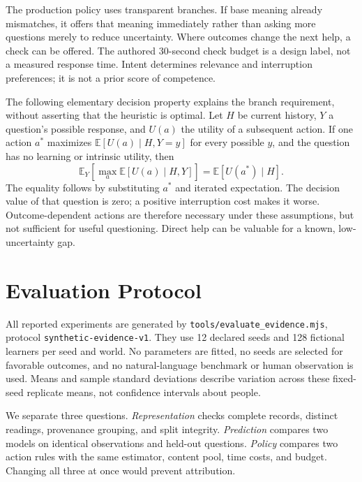 \documentclass{article}
\newcommand{\artifact}[1]{\nolinkurl{#1}}
\begin{document}
The production policy uses transparent branches. If base meaning already mismatches, it offers that meaning immediately rather than asking more questions merely to reduce uncertainty. Where outcomes change the next help, a check can be offered. The authored 30-second check budget is a design label, not a measured response time. Intent determines relevance and interruption preferences; it is not a prior score of competence.

The following elementary decision property explains the branch requirement, without asserting that the heuristic is optimal. Let $H$ be current history, $Y$ a question's possible response, and $U(a)$ the utility of a subsequent action. If one action $a^*$ maximizes $\mathbb E[U(a)\mid H,Y=y]$ for every possible $y$, and the question has no learning or intrinsic utility, then
\begin{equation}
\mathbb E_Y\!\left[\max_a\mathbb E[U(a)\mid H,Y]\right]
=\mathbb E[U(a^*)\mid H].
\end{equation}
The equality follows by substituting $a^*$ and iterated expectation. The decision value of that question is zero; a positive interruption cost makes it worse. Outcome-dependent actions are therefore necessary under these assumptions, but not sufficient for useful questioning. Direct help can be valuable for a known, low-uncertainty gap.

\section{Evaluation Protocol}
\label{sec:evaluation}

All reported experiments are generated by \artifact{tools/evaluate_evidence.mjs}, protocol \artifact{synthetic-evidence-v1}. They use 12 declared seeds and 128 fictional learners per seed and world. No parameters are fitted, no seeds are selected for favorable outcomes, and no natural-language benchmark or human observation is used. Means and sample standard deviations describe variation across these fixed-seed replicate means, not confidence intervals about people.

We separate three questions. \emph{Representation} checks complete records, distinct readings, provenance grouping, and split integrity. \emph{Prediction} compares two models on identical observations and held-out questions. \emph{Policy} compares two action rules with the same estimator, content pool, time costs, and budget. Changing all three at once would prevent attribution.
\end{document}
